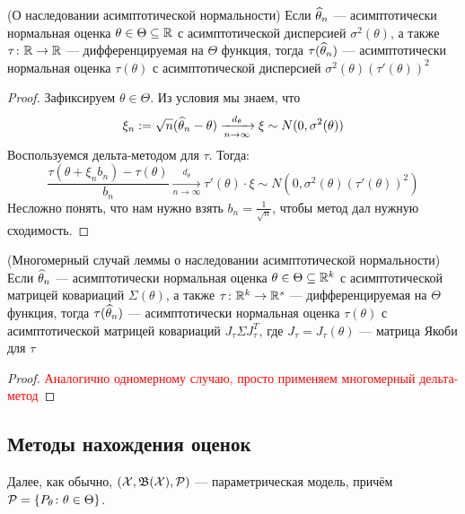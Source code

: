 \begin{lemma} (О наследовании асимптотической нормальности)
	Если $\widehat{\theta}_n$ --- асимптотически нормальная оценка $\theta \in \Theta \subseteq \mathbb{R}$ с асимптотической дисперсией $\sigma^2(\theta)$, а также $\tau \colon \mathbb{R} \to \mathbb{R}$ --- дифференцируемая на $\Theta$ функция, тогда $\tau(\widehat{\theta}_n)$ --- асимптотически нормальная оценка $\tau(\theta)$ с асимптотической дисперсией $\sigma^2(\theta)(\tau'(\theta))^2$
\end{lemma}

\begin{proof}
	Зафиксируем $\theta \in \Theta$. Из условия мы знаем, что
	\[
		\xi_n := \sqrt{n}(\widehat{\theta}_n - \theta) \xrightarrow[n \to \infty]{d_\theta} \xi \sim N(0, \sigma^2(\theta))
	\]
	Воспользуемся дельта-методом для $\tau$. Тогда:
	\[
		\frac{\tau(\theta + \xi_nb_n) - \tau(\theta)}{b_n} \xrightarrow[n \to \infty]{d_\theta} \tau'(\theta) \cdot \xi \sim N(0, \sigma^2(\theta)(\tau'(\theta))^2)
	\]
	Несложно понять, что нам нужно взять $b_n = \frac{1}{\sqrt{n}}$, чтобы метод дал нужную сходимость.
\end{proof}

\begin{proposition} (Многомерный случай леммы о наследовании асимптотической нормальности)
	Если $\widehat{\theta}_n$ --- асимптотически нормальная оценка $\theta \in \Theta \subseteq \mathbb{R}^k$ с асимптотической матрицей ковариаций $\Sigma(\theta)$, а также $\tau \colon \mathbb{R}^k \to \mathbb{R}^s$ --- дифференцируемая на $\Theta$ функция, тогда $\tau(\widehat{\theta}_n)$ --- асимптотически нормальная оценка $\tau(\theta)$ с асимптотической матрицей ковариаций $J_\tau \Sigma J_\tau^T$, где $J_\tau = J_\tau(\theta)$ --- матрица Якоби для $\tau$
\end{proposition}

\begin{proof}
	\textcolor{red}{Аналогично одномерному случаю, просто применяем многомерный дельта-метод}
\end{proof}

\subsection{Методы нахождения оценок}

\begin{note}
	Далее, как обычно, $(\mathcal{X}, \mathfrak{B}(\mathcal{X}), \mathcal{P})$ --- параметрическая модель, причём $\mathcal{P} = \{P_\theta \colon \theta \in \Theta\}$.
\end{note}

